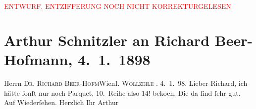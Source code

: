 
\begin{center}
            \textcolor{red}{ENTWURF. ENTZIFFERUNG NOCH NICHT KORREKTURGELESEN}
                      \end{center}
            
               \section[Arthur Schnitzler an Richard Beer-Hofmann, 4. 1. 1898]{ Arthur Schnitzler an Richard Beer-Hofmann, 4. 1. 1898}\nopagebreak{}\rehead{ }\begin{ledgroupsized}[t]{13cm}\normalsize\beginnumbering{} \toendnotes[C]{\smallbreak\pagebreak[2]} 
\pstart{}{\pb}Herrn \textsc{Dr. Richard
                        Beer-Hofm}\pend{}\pstart{}Wien\pend{}\pstart{}\textsc{I. Wollzeile{ }}.\pend{}{\bigskip}\pstart
           \raggedleft{}{\pb}4. 1. 98.\pend
           \pstart
           Lieber Richard, ich hätte ſonſt nur noch Parquet, 10. Reihe also 14!
                  beko{\geminationm}en. Die da ſind ſehr gut. Auf Wiederſehen.
               Herzlich Ihr\pend
           \pstart \spacefill\mbox{Arthur}\pend{}\endnumbering{}\end{ledgroupsized}  \newcommand{\dateiname}{L00758}\newcommand{\titel}{Arthur Schnitzler an Richard Beer-Hofmann, 4. 1. 1898}\newcommand{\editorInnen}{Martin Anton Müller und Gerd-Hermann Susen}
      